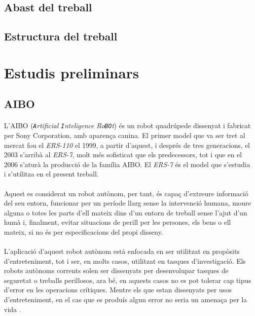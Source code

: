 \documentclass[12pt,a4paper,final,twoside]{article}
\begin{document}
\subsection*{Abast del treball}

\label{Estructura}
\subsection*{Estructura del treball}

\newpage

\label{Estudis-preliminars}
\section{Estudis preliminars}

\label{AIBO}
\subsection{AIBO}
\paragraph{}L'AIBO (\textit{\texttt{A}rtificial \texttt{I}nteligence Ro\texttt{BO}t}) és un robot quadrúpede dissenyat i fabricat per Sony Corporation, amb aparença canina. El primer model que va ser tret al mercat fou el \textit{ERS-110} el 1999, a partir d'aquest, i després de tres generacions, el 2003 s'arribà al \textit{ERS-7}, molt més sofisticat que els predecessors, tot i que en el 2006 s'aturà la producció de la família AIBO. El \textit{ERS-7} és el model que s'estudia i s'utilitza en el present treball.

\paragraph{}Aquest es considerat un robot autònom, per tant, és capaç d'extreure informació del seu entorn, funcionar per un període llarg sense la intervenció humana, moure alguna o totes les parts d'ell mateix dins d'un entorn de treball sense l'ajut d'un humà i, finalment, evitar situacions de perill per les persones, els bens o ell mateix, si no és per especificacions del propi disseny.

\paragraph{}L'aplicació d'aquest robot autònom està enfocada en ser utilitzat en propòsits d'entreteniment, tot i ser, en molts casos, utilitzat en tasques d'investigació. Els robots autònoms corrents solen ser dissenyats per desenvolupar tasques de seguretat o treballs perillosos, ara bé, en aquests casos no es pot tolerar cap tipus d'error en les operacions crítiques. Mentre els que estan dissenyats per usos d'entreteniment, en el cas que es produís algun error no seria un amenaça per la vida \cite{Fujita2000}.
\end{document}
